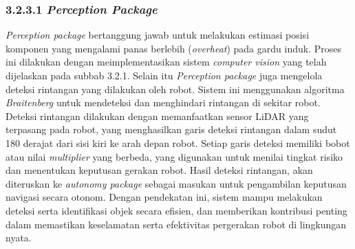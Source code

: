 \subsubsection{3.2.3.1 \emph{Perception Package}}
\emph{Perception package} bertanggung jawab untuk melakukan estimasi posisi komponen yang mengalami panas berlebih (\emph{overheat}) pada gardu induk. Proses ini dilakukan dengan meimplementasikan sistem \emph{computer vision} yang telah dijelaskan pada subbab 3.2.1.  Selain itu \emph{Perception package} juga mengelola deteksi rintangan yang dilakukan oleh robot. Sistem ini menggunakan algoritma \emph{Braitenberg} untuk mendeteksi dan menghindari rintangan di sekitar robot. Deteksi rintangan dilakukan dengan memanfaatkan sensor LiDAR yang terpasang pada robot, yang menghasilkan garis deteksi rintangan dalam sudut 180 derajat dari sisi kiri ke arah depan robot. Setiap garis deteksi memiliki bobot atau nilai \emph{multiplier} yang berbeda, yang digunakan untuk menilai tingkat risiko dan menentukan keputusan gerakan robot. Hasil  deteksi rintangan, akan diteruskan ke \emph{autonomy package} sebagai masukan untuk pengambilan keputusan navigasi secara otonom. Dengan pendekatan ini, sistem mampu melakukan deteksi serta identifikasi objek secara efisien, dan memberikan kontribusi penting dalam memastikan keselamatan serta efektivitas pergerakan robot di lingkungan nyata.

